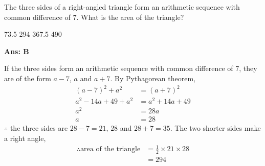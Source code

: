 \documentclass[varwidth=70mm]{standalone}
\begin{document}
The three sides of a right-angled triangle form an arithmetic sequence with common difference of \num{7}. What is the area of the triangle? 

\begin{choices}
\choice \num{73.5}
\choice \num{294}%
\choice \num{367.5}
\choice \num{490}
\end{choices}

\begin{answer}
\hrulefill\par
\textbf{Ans: B}

If the three sides form an arithmetic sequence with common difference of \num{7}, they are of the form $a-7$, $a$ and $a+7$. By Pythagorean theorem,
\begin{equation*}
\begin{aligned}
(a-7)^2 + a^2 &= (a+7)^2 \\
a^2 - 14a + 49 + a^2 &= a^2 + 14a + 49 \\
a^2 &= 28a \\
a &= 28
\end{aligned}
\end{equation*}
$\therefore$ the three sides are $28-7=21$, $28$ and $28+7=35$. The two shorter sides make a right angle,
\begin{equation*}
\begin{aligned}
\therefore\text{area of the triangle} &= \frac{1}{2}\times 21\times28 \\
&= 294
\end{aligned}
\end{equation*} 

\end{answer}
\end{document}
